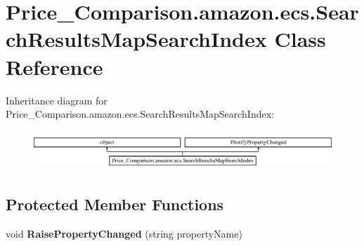 \hypertarget{class_price___comparison_1_1amazon_1_1ecs_1_1_search_results_map_search_index}{\section{Price\-\_\-\-Comparison.\-amazon.\-ecs.\-Search\-Results\-Map\-Search\-Index Class Reference}
\label{class_price___comparison_1_1amazon_1_1ecs_1_1_search_results_map_search_index}
}


 


Inheritance diagram for Price\-\_\-\-Comparison.\-amazon.\-ecs.\-Search\-Results\-Map\-Search\-Index\-:\begin{figure}[H]
\begin{center}
\leavevmode
\includegraphics[height=1.489362cm]{class_price___comparison_1_1amazon_1_1ecs_1_1_search_results_map_search_index}
\end{center}
\end{figure}
\subsection*{Protected Member Functions}
\begin{DoxyCompactItemize}
\item 
\hypertarget{class_price___comparison_1_1amazon_1_1ecs_1_1_search_results_map_search_index_a54bdcefce12d000af611d181dec2a3dd}{void {\bfseries Raise\-Property\-Changed} (string property\-Name)}\label{class_price___comparison_1_1amazon_1_1ecs_1_1_search_results_map_search_index_a54bdcefce12d000af611d181dec2a3dd}

\end{DoxyCompactItemize}
